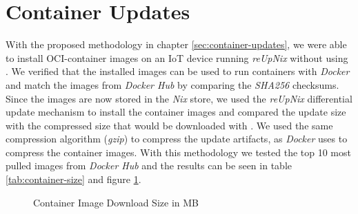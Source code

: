 \section{Container Updates}
With the proposed methodology in chapter \ref{sec:container-updates}, we were able
to install \ac{OCI}-container images
on an \ac{IoT} device running \textit{reUpNix} without using .
We verified that the installed images can be used to run containers with \textit{Docker}
and match the images from \textit{Docker Hub} by comparing the \textit{SHA256} checksums.
Since the images are now stored in the \textit{Nix} store, we used the \textit{reUpNix}
differential update mechanism to install the container images and compared the update size
with the compressed size that would be downloaded with . We used
the same compression algorithm (\textit{gzip}) to compress the update artifacts,
as \textit{Docker} uses to compress the container images. With this methodology
we tested the top 10 most pulled images from \textit{Docker Hub} and the results
can be seen in table \ref{tab:container-size} and figure \ref{fig:container-size}.

\begin{figure}[htbp]
  \centering
  \caption{Container Image Download Size in MB}
  \label{fig:container-size}
\end{figure}

